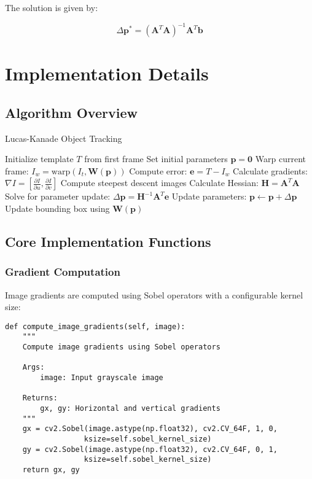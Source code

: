 \documentclass[12pt,a4paper]{article}
\begin{document}
The solution is given by:

\begin{equation}
\Delta\mathbf{p}^* = (\mathbf{A}^T\mathbf{A})^{-1}\mathbf{A}^T\mathbf{b}
\end{equation}

\section{Implementation Details}

\subsection{Algorithm Overview}

\begin{algorithm}[H]
\caption{Lucas-Kanade Object Tracking}
\begin{algorithmic}[1]
\STATE Initialize template $T$ from first frame
\STATE Set initial parameters $\mathbf{p} = \mathbf{0}$
    \REPEAT
        \STATE Warp current frame: $I_w = \text{warp}(I_t, \mathbf{W}(\mathbf{p}))$
        \STATE Compute error: $\mathbf{e} = T - I_w$
        \STATE Calculate gradients: $\nabla I = [\frac{\partial I}{\partial u}, \frac{\partial I}{\partial v}]$
        \STATE Compute steepest descent images
        \STATE Calculate Hessian: $\mathbf{H} = \mathbf{A}^T\mathbf{A}$
        \STATE Solve for parameter update: $\Delta\mathbf{p} = \mathbf{H}^{-1}\mathbf{A}^T\mathbf{e}$
        \STATE Update parameters: $\mathbf{p} \leftarrow \mathbf{p} + \Delta\mathbf{p}$
    \STATE Update bounding box using $\mathbf{W}(\mathbf{p})$
\ENDFOR
\end{algorithmic}
\end{algorithm}

\subsection{Core Implementation Functions}

\subsubsection{Gradient Computation}
Image gradients are computed using Sobel operators with a configurable kernel size:

\begin{lstlisting}[caption=Gradient Computation]
def compute_image_gradients(self, image):
    """
    Compute image gradients using Sobel operators
    
    Args:
        image: Input grayscale image
        
    Returns:
        gx, gy: Horizontal and vertical gradients
    """
    gx = cv2.Sobel(image.astype(np.float32), cv2.CV_64F, 1, 0, 
                  ksize=self.sobel_kernel_size)
    gy = cv2.Sobel(image.astype(np.float32), cv2.CV_64F, 0, 1, 
                  ksize=self.sobel_kernel_size)
    return gx, gy
\end{lstlisting}
\end{document}
